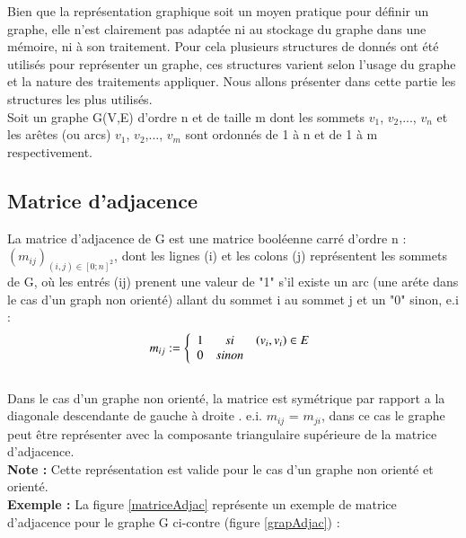 Bien que la représentation graphique soit un moyen pratique pour définir un graphe, elle n’est clairement pas adaptée ni au stockage du graphe dans une mémoire, ni à son traitement. Pour cela plusieurs structures de donnés ont été utilisés pour représenter un graphe, ces structures varient selon l’usage du graphe et la nature des traitements appliquer. Nous allons présenter dans cette partie les structures les plus utilisés.
\\Soit un graphe G(V,E) d’ordre n et de taille m dont les sommets $\textit{v}_{1}$, $\textit{v}_{2}$,..., $\textit{v}_{n}$ et les arêtes (ou arcs) $\textit{v}_{1}$, $\textit{v}_{2}$,..., $\textit{v}_{m}$ sont ordonnés de 1 à n et de 1 à m respectivement.
		
		

		
			\subsection{Matrice d'adjacence}
			
				La matrice d’adjacence de G est une matrice booléenne 					carré d’ordre n : ${({m}_{ij})}_{(i,j) \in {[0;n]}^{2}}$,  dont les 					lignes (i) et les colons (j)  représentent les sommets de G, 			où les entrés (ij) prenent une valeur de "1" s’il existe un 				arc (une aréte dans le cas d'un graph non orienté) allant du 			sommet i au sommet j et un "0" sinon, e.i \citep{lehman2010mathematics} \citep{mathieu} \citep{IUT} :
			\[{m}_{ij} :=
			\left\{
			\begin{array}{r c l}
			1 & si & (\textit{v}_{i} , \textit{v}_{i}) \in E \\
			0 & sinon
			\end{array}
			\right.
			\]
			\\
			Dans le cas d’un graphe non orienté, la matrice est 						symétrique par rapport a la diagonale descendante de gauche	 			à droite . e.i. ${m}_{ij}$ = ${m}_{ji}$, dans ce cas le 						graphe peut être représenter avec  la composante 							triangulaire supérieure de la matrice d'adjacence.\\
			\textbf{Note :} Cette représentation est valide pour le cas 					d'un graphe non orienté et orienté.\\
			\textbf{Exemple :} La figure \ref{matriceAdjac} représente 					un exemple de matrice d'adjacence pour le graphe G ci-contre 			(figure \ref{grapAdjac}) :
			
